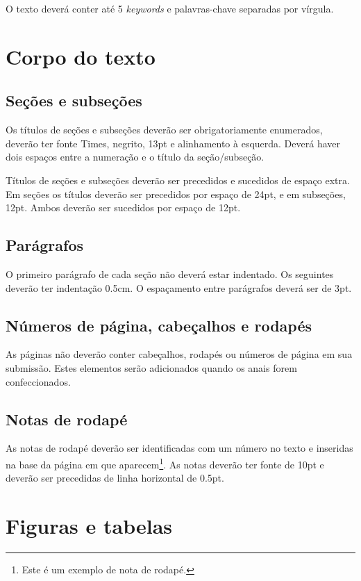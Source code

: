 \documentclass[12pt]{article}
\begin{document}
O texto deverá conter até 5 \textit{keywords} e palavras-chave
separadas por vírgula.

\section{Corpo do texto}

\subsection{Seções e subseções}
\label{sec:secoes}

Os títulos de seções e subseções deverão ser obrigatoriamente
enumerados, deverão ter fonte Times, negrito, 13pt e alinhamento à
esquerda. Deverá haver dois espaços entre a numeração e o título da
seção/subseção.

Títulos de seções e subseções deverão ser precedidos e sucedidos de
espaço extra. Em seções os títulos deverão ser precedidos por espaço
de 24pt, e em subseções, 12pt. Ambos deverão ser sucedidos por espaço
de 12pt.

\subsection{Parágrafos}
\label{sec:paragrafos}

O primeiro parágrafo de cada seção não deverá estar indentado. Os
seguintes deverão ter indentação 0.5cm. O espaçamento entre parágrafos
deverá ser de 3pt.

\subsection{Números de página, cabeçalhos e rodapés}

As páginas não deverão conter cabeçalhos, rodapés ou números de página
em sua submissão. Estes elementos serão adicionados quando os anais
forem confeccionados.

\subsection{Notas de rodapé}

As notas de rodapé deverão ser identificadas com um número no texto e
inseridas na base da página em que aparecem\footnote{Este é um exemplo
  de nota de rodapé.}. As notas deverão ter fonte de 10pt e deverão ser
precedidas de linha horizontal de 0.5pt.

\section{Figuras e tabelas}
\label{sec:figuras-e-tabelas}
\end{document}
